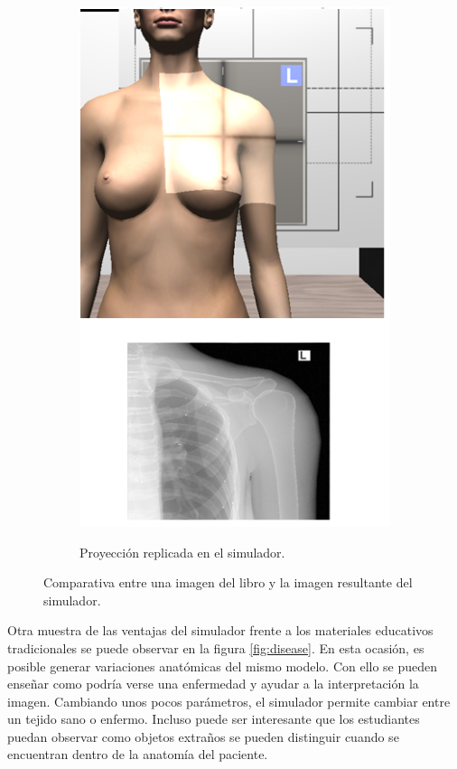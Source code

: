 \begin{figure}[h]
\begin{subfigure}[b]{0.45\linewidth}
        {\includegraphics[width=\linewidth]{IMG/XRayshoulder3.png}}
        \caption{Proyección replicada en el simulador.}
    \end{subfigure}
    \caption{\label{fig:xraycomp} Comparativa entre una imagen del libro\cite{carver2012medical} y la imagen resultante del simulador.}
   \end{figure}

Otra muestra de las ventajas del simulador frente a los materiales educativos tradicionales se puede observar en la figura \ref{fig:disease}. En esta ocasión, es posible generar variaciones anatómicas del mismo modelo. Con ello se pueden enseñar como podría verse una enfermedad y ayudar a la interpretación la imagen. Cambiando unos pocos parámetros, el simulador permite cambiar entre un tejido sano o enfermo. Incluso puede ser interesante que los estudiantes puedan observar como objetos extraños se pueden distinguir cuando se encuentran dentro de la anatomía del paciente. 

